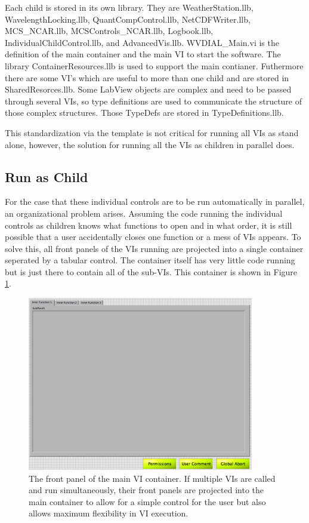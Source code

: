 Each child is stored in its own library. They are WeatherStation.llb, WavelengthLocking.llb, QuantCompControl.llb, NetCDFWriter.llb, MCS\_NCAR.llb, MCSControls\_NCAR.llb, Logbook.llb, IndividualChildControl.llb, and AdvancedVis.llb. WVDIAL\_Main.vi is the definition of the main container and the main VI to start the software. The library ContainerResources.llb is used to support the main contianer. Futhermore there are some VI's which are useful to more than one child and are stored in SharedResorces.llb. Some LabView objects are complex and need to be passed through several VIs, so type definitions are used to communicate the structure of those complex structures. Those TypeDefs are stored in TypeDefinitions.llb. 

This standardization via the template is not critical for running all VIs as stand alone, however, the solution for running all the VIs as children in parallel does. 

\subsection{Run as Child}

For the case that these individual controls are to be run automatically in parallel, an organizational problem arises. Assuming the code running the individual controls as children knows what functions to open and in what order, it is still possible that a user accidentally closes one function or a mess of VIs appears. To solve this, all front panels of the VIs running are projected into a single container seperated by a tabular control. The container itself has very little code running but is just there to contain all of the sub-VIs. This container is shown in Figure \ref{Fig:VIContainer}.

\begin{figure}[!ht]\centering
\includegraphics[height=3in]{Figures/MainVIContainer}
\caption{The front panel of the main VI container. If multiple VIs are called and run simultaneously, their front panels are projected into the main container to allow for a simple control for the user but also allows maximum flexibility in VI execution.}\label{Fig:VIContainer}
\end{figure}


